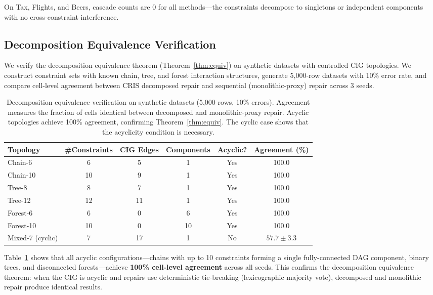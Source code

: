\documentclass{article}
\newcommand{\cris}{\textsc{CRIS}\xspace}
\begin{document}
On Tax, Flights, and Beers, cascade counts are 0 for all methods---the constraints decompose to singletons or independent components with no cross-constraint interference.

\subsection{Decomposition Equivalence Verification}
\label{sec:equivalence}

We verify the decomposition equivalence theorem (Theorem~\ref{thm:equiv}) on synthetic datasets with controlled CIG topologies. We construct constraint sets with known chain, tree, and forest interaction structures, generate 5,000-row datasets with 10\% error rate, and compare cell-level agreement between \cris decomposed repair and sequential (monolithic-proxy) repair across 3 seeds.

\begin{table}[t]
\caption{Decomposition equivalence verification on synthetic datasets (5,000 rows, 10\% errors). Agreement measures the fraction of cells identical between decomposed and monolithic-proxy repair. Acyclic topologies achieve 100\% agreement, confirming Theorem~\ref{thm:equiv}. The cyclic case shows that the acyclicity condition is necessary.}
\label{tab:equiv}
\centering
\begin{tabular}{lccccc}
\toprule
Topology & \#Constraints & CIG Edges & Components & Acyclic? & Agreement (\%) \\
\midrule
Chain-6 & 6 & 5 & 1 & Yes & 100.0 \\
Chain-10 & 10 & 9 & 1 & Yes & 100.0 \\
Tree-8 & 8 & 7 & 1 & Yes & 100.0 \\
Tree-12 & 12 & 11 & 1 & Yes & 100.0 \\
Forest-6 & 6 & 0 & 6 & Yes & 100.0 \\
Forest-10 & 10 & 0 & 10 & Yes & 100.0 \\
\midrule
Mixed-7 (cyclic) & 7 & 17 & 1 & No & $57.7 \pm 3.3$ \\
\bottomrule
\end{tabular}
\end{table}

Table~\ref{tab:equiv} shows that all acyclic configurations---chains with up to 10 constraints forming a single fully-connected DAG component, binary trees, and disconnected forests---achieve \textbf{100\% cell-level agreement} across all seeds. This confirms the decomposition equivalence theorem: when the CIG is acyclic and repairs use deterministic tie-breaking (lexicographic majority vote), decomposed and monolithic repair produce identical results.
\end{document}
